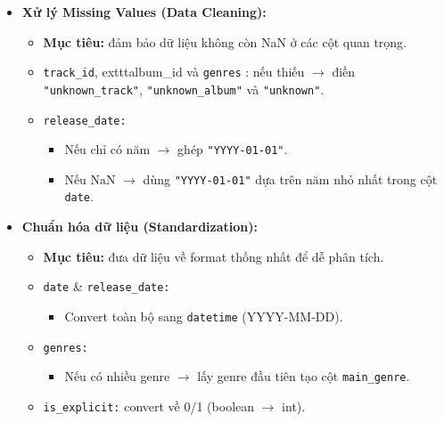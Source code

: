 \begin{itemize}
    \item \textbf{Xử lý Missing Values (Data Cleaning):}
    \begin{itemize}
        \item \textbf{Mục tiêu:} đảm bảo dữ liệu không còn NaN ở các cột quan trọng.
        \item \texttt{track\_id}, exttt{album\_id} và \texttt{genres} : nếu thiếu $\rightarrow$ điền \texttt{"unknown\_track"}, \texttt{"unknown\_album"} và \texttt{"unknown"}.
        \item \texttt{release\_date:}
        \begin{itemize}
            \item Nếu chỉ có năm $\rightarrow$ ghép \texttt{"YYYY-01-01"}.
            \item Nếu NaN $\rightarrow$ dùng \texttt{"YYYY-01-01"} dựa trên năm nhỏ nhất trong cột \texttt{date}.
        \end{itemize}

    \end{itemize}

    \item \textbf{Chuẩn hóa dữ liệu (Standardization):}
    

    

    \begin{itemize}
        \item \textbf{Mục tiêu:} đưa dữ liệu về format thống nhất để dễ phân tích.
        \item \texttt{date} \& \texttt{release\_date:}
        \begin{itemize}
            \item Convert toàn bộ sang \texttt{datetime} (YYYY-MM-DD).
        \end{itemize}
        \item \texttt{genres:}
        \begin{itemize}
            \item Nếu có nhiều genre $\rightarrow$ lấy genre đầu tiên tạo cột \texttt{main\_genre}.
        \end{itemize}
        \item \texttt{is\_explicit:} convert về 0/1 (boolean $\rightarrow$ int).
    \end{itemize}
\end{itemize}




